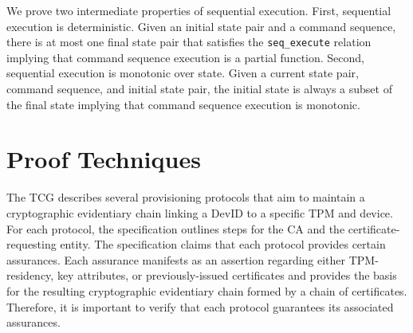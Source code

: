 \documentclass[runningheads]{llncs}
\begin{document}
We prove two intermediate properties of sequential execution. First,
sequential execution is deterministic. Given an initial state pair and
a command sequence, there is at most one final state pair that
satisfies the \verb|seq_execute| relation implying that command
sequence execution is a partial function. Second, sequential execution
is monotonic over state. Given a current state pair, command sequence,
and initial state pair, the initial state is always a subset of the
final state implying that command sequence execution is monotonic.

  

%
%
%
\section{Proof Techniques}

The TCG describes several provisioning protocols
\citep{DevIDSpec-TCG} that aim to maintain a cryptographic evidentiary 
chain linking a DevID to a specific TPM and device. For each
protocol, the specification outlines steps for the CA and the
certificate-requesting entity.  The specification claims that each
protocol provides certain assurances.  Each assurance manifests as an
assertion regarding either TPM-residency, key attributes, or
previously-issued certificates and provides the basis for the
resulting cryptographic evidentiary chain formed by a chain of
certificates. Therefore, it is important to verify that each protocol
guarantees its associated assurances.
\end{document}
